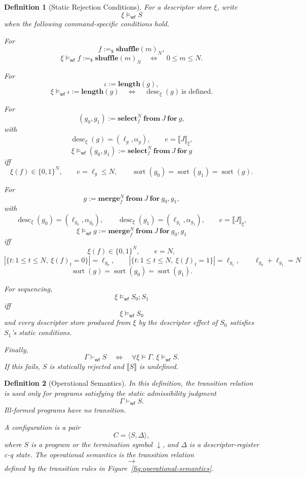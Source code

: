 \documentclass[acmsmall,screen,review,anonymous,nonacm]{acmart}
\newtheorem{definition}{Definition}[section]
\theoremstyle{defn_style}
\newcommand{\sem}[1]{\llbracket #1 \rrbracket}
\begin{document}
\begin{definition}[Static Rejection Conditions]
For a descriptor store \(\xi\), write
\[
\xi\models_{\mathsf{wf}}S
\]
when the following command-specific conditions hold.

For
\[
f:=_{\$}\mathbf{shuffle}(m)_N,
\]
\[
\xi\models_{\mathsf{wf}}f:=_{\$}\mathbf{shuffle}(m)_N
\quad\Longleftrightarrow\quad
0\le m\le N.
\]

For
\[
\iota:=\mathbf{length}(g),
\]
\[
\xi\models_{\mathsf{wf}}\iota:=\mathbf{length}(g)
\quad\Longleftrightarrow\quad
\operatorname{desc}_{\xi}(g)\ \text{is defined}.
\]

For
\[
(g_0,g_1):=
\mathbf{select}_{f}^{N}\ \mathbf{from}\ J\ \mathbf{for}\ g,
\]
with
\[
\operatorname{desc}_{\xi}(g)=(\ell_g,\alpha_g),
\qquad
e=\llbracket J\rrbracket_{\xi},
\]
\[
\xi\models_{\mathsf{wf}}
(g_0,g_1):=
\mathbf{select}_{f}^{N}\ \mathbf{from}\ J\ \mathbf{for}\ g
\]
iff
\[
\xi(f)\in\{0,1\}^{N},
\qquad
e=\ell_g\le N,
\qquad
\operatorname{sort}(g_0)=\operatorname{sort}(g_1)=\operatorname{sort}(g).
\]

For
\[
g:=
\mathbf{merge}_{f}^{N}\ \mathbf{from}\ J\ \mathbf{for}\ g_0,g_1,
\]
with
\[
\operatorname{desc}_{\xi}(g_0)=(\ell_{g_0},\alpha_{g_0}),
\qquad
\operatorname{desc}_{\xi}(g_1)=(\ell_{g_1},\alpha_{g_1}),
\qquad
e=\llbracket J\rrbracket_{\xi},
\]
\[
\xi\models_{\mathsf{wf}}
g:=
\mathbf{merge}_{f}^{N}\ \mathbf{from}\ J\ \mathbf{for}\ g_0,g_1
\]
iff
\[
\xi(f)\in\{0,1\}^{N},
\qquad
e=N,
\]
\[
|\{t:1\le t\le N,\ \xi(f)_t=0\}|=\ell_{g_0},
\qquad
|\{t:1\le t\le N,\ \xi(f)_t=1\}|=\ell_{g_1},\qquad\ell_{g_0}+\ell_{g_1}=N
\]
\[
\operatorname{sort}(g)=\operatorname{sort}(g_0)=\operatorname{sort}(g_1).
\]

For sequencing,
\[
\xi\models_{\mathsf{wf}}S_0;S_1
\]
iff
\[
\xi\models_{\mathsf{wf}}S_0
\]
and every descriptor store produced from \(\xi\) by the descriptor effect of
\(S_0\) satisfies \(S_1\)'s static conditions.

Finally,
\[
\Gamma\vdash_{\mathsf{wf}}S
\quad\Longleftrightarrow\quad
\forall \xi\models\Gamma.\;\xi\models_{\mathsf{wf}}S.
\]
If this fails, \(S\) is statically rejected and \(\sem S\) is undefined.
\end{definition}

\begin{definition}[Operational Semantics]
In this definition, the transition relation is used only for programs satisfying
the static admissibility judgment
\[
\Gamma\vdash_{\mathsf{wf}} S.
\]
Ill-formed programs have no transition.

A configuration is a pair
\[
C=\langle S,\Delta\rangle,
\]
where \(S\) is a program or the termination symbol \(\downarrow\), and
\(\Delta\) is a descriptor-register c-q state. The operational semantics is the
transition relation
\[
\longrightarrow
\]
defined by the transition rules in Figure~\ref{fig:operational-semantics}.
\end{definition}
\end{document}
